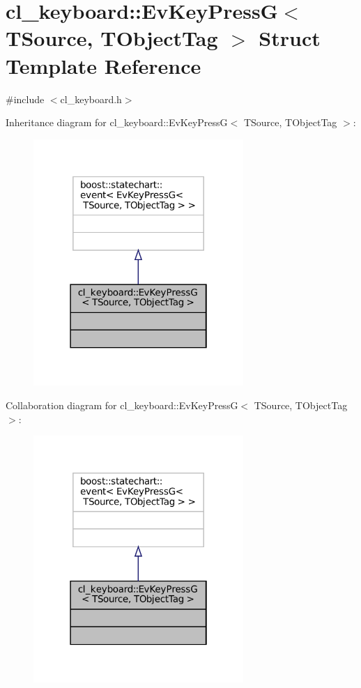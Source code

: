\hypertarget{structcl__keyboard_1_1EvKeyPressG}{}\section{cl\+\_\+keyboard\+:\+:Ev\+Key\+PressG$<$ T\+Source, T\+Object\+Tag $>$ Struct Template Reference}
\label{structcl__keyboard_1_1EvKeyPressG}


{\ttfamily \#include $<$cl\+\_\+keyboard.\+h$>$}



Inheritance diagram for cl\+\_\+keyboard\+:\+:Ev\+Key\+PressG$<$ T\+Source, T\+Object\+Tag $>$\+:
\nopagebreak
\begin{figure}[H]
\begin{center}
\leavevmode
\includegraphics[width=226pt]{structcl__keyboard_1_1EvKeyPressG__inherit__graph}
\end{center}
\end{figure}


Collaboration diagram for cl\+\_\+keyboard\+:\+:Ev\+Key\+PressG$<$ T\+Source, T\+Object\+Tag $>$\+:
\nopagebreak
\begin{figure}[H]
\begin{center}
\leavevmode
\includegraphics[width=226pt]{structcl__keyboard_1_1EvKeyPressG__coll__graph}
\end{center}
\end{figure}


